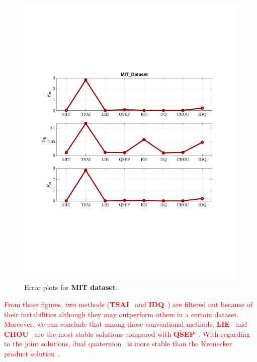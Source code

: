 \documentclass[a4paper]{report}
\begin{document}
\begin{figure}
\centering
\includegraphics[scale=0.7]{./hand_eye_figures/real/Result_MIT_Dataset}
\caption{Error plots for \textbf{MIT dataset}.}
\end{figure}

\textcolor{red}{
From those figures, two methods (\textbf{TSAI}~\cite{tsai1989new} and \textbf{IDQ}~\cite{malti2010robust}) are filtered out because of their instabilities although they may outperform others in a certain dataset. Moreover, we can conclude that among those conventional methods, \textbf{LIE}~\cite{park1994robot} and \textbf{CHOU}~\cite{chou1991finding} are the most stable solutions compared with \textbf{QSEP}~\cite{horaud1995hand}. With regarding to the joint solutions, dual quaternion~\cite{daniilidis1999hand} is more stable than the Kronecker product solution~\cite{andreff1999line}}.
\end{document}
